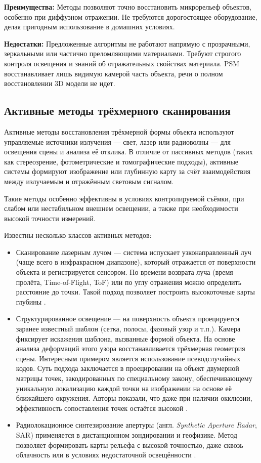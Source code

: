 \textbf{Преимущества:} Методы позволяют точно восстановить микрорельеф объектов,
особенно при диффузном отражении. Не требуются дорогостоящее оборудование,
делая пригодным использование в домашних условиях.

\textbf{Недостатки:} Предложенные алгоритмы не работают напрямую с прозрачными,
зеркальными или частично преломляющими материалами. Требуют строгого контроля
освещения и знаний об отражательных свойствах материала. PSM восстанавливает
лишь видимую камерой часть объекта, речи о полном восстановлении 3D модели не идет.

\subsection{Активные методы трёхмерного сканирования}

Активные методы восстановления трёхмерной формы объекта используют управляемые
источники излучения — свет, лазер или радиоволны — для освещения сцены и анализа
её отклика. В отличие от пассивных методов (таких как стереозрение,
фотометрические и томографические подходы), активные системы формируют
изображение или глубинную карту за счёт взаимодействия между излучаемым и
отражённым световым сигналом.

Такие методы особенно эффективны в условиях контролируемой съёмки, при слабом
или нестабильном внешнем освещении, а также при необходимости высокой точности
измерений.

Известны несколько классов активных методов:

\begin{itemize}
	\item Сканирование лазерным лучом — система испускает узконаправленный луч
	(чаще всего в инфракрасном диапазоне), который отражается от поверхности
	объекта и регистрируется сенсором. По времени возврата луча (время
	пролёта, Time-of-Flight, ToF) или по углу отражения можно определить
	расстояние до точки. Такой подход позволяет построить высокоточные карты
	глубины \cite{10.1109/CVPR.2010.5540082}.
	\item Структурированное освещение — на поверхность объекта проецируется
	заранее известный шаблон (сетка, полосы, фазовый узор и т.п.). Камера
	фиксирует искажения шаблона, вызванные формой объекта. На основе анализа
	деформаций этого узора восстанавливается трёхмерная геометрия сцены. Интересным
	примером является использование псеводслучайных кодов. Суть подхода
	заключается в проецировании на объект двумерной матрицы точек, закодированных
	по специальному закону, обеспечивающему уникальную локализацию каждой точки на
	изображении на основе её ближайшего окружения. Авторы показали, что даже при наличии
	окклюзии, эффективность сопоставления точек остаётся высокой \cite{10.1109/34.667888}.
	\item Радиолокационное синтезирование апертуры (англ. \emph{Synthetic Aperture
	Radar}, SAR) применяется в дистанционном зондировании и геофизике. Метод
	позволяет формировать карты рельефа с высокой точностью, даже сквозь
	облачность или в условиях недостаточной освещённости \cite{Antipov1988}.
\end{itemize}

